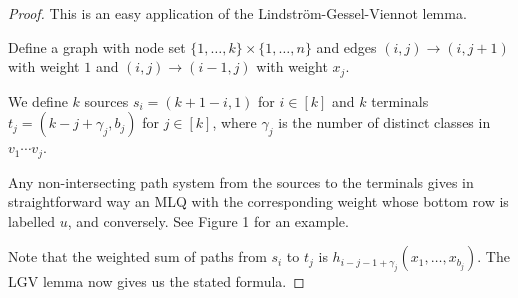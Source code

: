 \documentclass[reqno]{amsart}
\newcommand{\0}{\phantom{c}}
\theoremstyle{plain}
\theoremstyle{definition}
\numberwithin{equation}{section}
\begin{document}
\begin{proof}
This is an easy application of the Lindstr\"om-Gessel-Viennot lemma.

Define a graph with node set $\{1,\dotsc,k\} \times \{1, \dotsc, n\}$ and edges $(i,j) \to (i,j+1)$ with weight $1$ and $(i,j) \to (i-1,j)$ with weight $x_j$. 

We define $k$ sources $s_i = (k+1-i, 1)$ for $i\in[k]$ and $k$ terminals $t_j = (k-j+\gamma_j,b_j)$ for $j\in[k]$, where $\gamma_j$ is the number of distinct classes in $v_1\dotsm v_j$.

Any non-intersecting path system from the sources to the terminals gives in straightforward way an MLQ with the corresponding weight whose bottom row is labelled $u$, and conversely. See Figure 1 for an example.

Note that the weighted sum of paths from $s_i$ to $t_j$ is $h_{i-j-1+\gamma_j}(x_1,\dots,x_{b_j})$. The LGV lemma now gives us the stated formula.
\end{proof}
\end{document}
